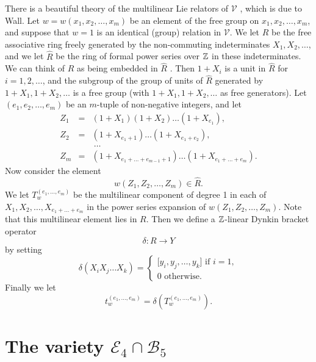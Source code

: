 \documentclass[12pt]{article}
\begin{document}
There is a beautiful theory of the multilinear Lie relators of $\mathcal{V}$%
, which is due to Wall. Let $w=w(x_1,x_2,\ldots ,x_m)$ be an element of the
free group on $x_1,x_2,\ldots ,x_m$, and suppose that $w=1$ is an identical
(group) relation in $\mathcal{V}$. We let $R$ be the free associative ring
freely generated by the non-commuting indeterminates $X_1,X_2,\ldots $, and
we let $\widehat{R}$ be the ring of formal power series over $\Bbb{Z}$ in
these indeterminates. We can think of $R$ as being embedded in $\widehat{R}$%
. Then $1+X_i$ is a unit in $\widehat{R}$ for $i=1,2,\ldots $, and the
subgroup of the group of units of $\widehat{R}$ generated by $%
1+X_1,1+X_2,\ldots $ is a free group (with $1+X_1,1+X_2,\ldots $ as free
generators). Let $(e_1,e_2,\ldots ,e_m)$ be an $m$-tuple of non-negative
integers, and let 
\begin{eqnarray*}
Z_1 &=&(1+X_1)(1+X_2)\ldots (1+X_{e_1}), \\
Z_2 &=&(1+X_{e_1+1})\ldots (1+X_{e_1+e_2}), \\
&&\ \ldots \ \  \\
Z_m &=&(1+X_{e_1+\ldots +e_{m-1}+1})\ldots (1+X_{e_1+\ldots +e_m}).
\end{eqnarray*}
Now consider the element 
\[
w(Z_1,Z_2,\ldots ,Z_m)\in \widehat{R}. 
\]
We let $T_w^{(e_1,\ldots ,e_m)}$ be the multilinear component of degree 1 in
each of $X_1,X_2,\ldots ,X_{e_1+\ldots +e_m}$ in the power series expansion
of $w(Z_1,Z_2,\ldots ,Z_m)$. Note that this multilinear element lies in $R$.
Then we define a $\Bbb{Z}$-linear Dynkin bracket operator 
\[
\delta :R\rightarrow Y 
\]
by setting 
\[
\delta (X_iX_j\ldots X_k)=\left\{ 
\begin{array}{l}
\lbrack y_i,y_j,\ldots ,y_k]\text{ if }i=1, \\ 
0\text{ otherwise.}
\end{array}
\right. 
\]
Finally we let 
\[
t_w^{(e_1,\ldots ,e_m)}=\delta (T_w^{(e_1,\ldots ,e_m)}). 
\]
 \bigskip

\section{The variety $\mathcal{E}_4\cap \mathcal{B}_5$}
\end{document}
